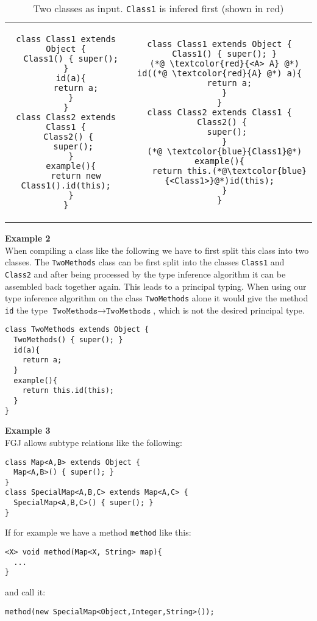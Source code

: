 \documentclass[runningheads]{llncs}
\begin{document}
\begin{table}
\caption{Two classes as input. \texttt{Class1} is infered first (shown in {\color{red}red})}
\begin{tabular}{cc}
\begin{lstlisting}
class Class1 extends Object {
  Class1() { super(); }
  id(a){
    return a;
  }
}
class Class2 extends Class1 {
  Class2() { 
    super(); 
  }
  example(){
    return new Class1().id(this);
  }
}
\end{lstlisting}
&
\begin{lstlisting}
class Class1 extends Object {
  Class1() { super(); }
  (*@ \textcolor{red}{<A> A} @*) id((*@ \textcolor{red}{A} @*) a){
    return a;
  }
}
class Class2 extends Class1 {
  Class2() { 
    super(); 
  }
  (*@ \textcolor{blue}{Class1}@*) example(){
    return this.(*@\textcolor{blue}{<Class1>}@*)id(this);
  }
}
\end{lstlisting}
\end{tabular}
\end{table}

\textbf{Example 2}\\
When compiling a class like the following
we have to first split this class into two classes.
The \texttt{TwoMethods} class can be first split into the classes \texttt{Class1}
and \texttt{Class2} and after being processed by the type inference algorithm it can be assembled back together again.
This leads to a principal typing.
When using our type inference algorithm on the class \texttt{TwoMethods} alone
it would give the method \texttt{id} the type $\texttt{TwoMethods} \to \texttt{TwoMethods}$,
which is not the desired principal type.
\begin{lstlisting}
class TwoMethods extends Object {
  TwoMethods() { super(); }
  id(a){
    return a;
  }
  example(){
    return this.id(this);
  }
}
\end{lstlisting}

\textbf{Example 3}\\
FGJ allows subtype relations like the following:
\begin{lstlisting}
class Map<A,B> extends Object {
  Map<A,B>() { super(); }
}
class SpecialMap<A,B,C> extends Map<A,C> {
  SpecialMap<A,B,C>() { super(); }
}
\end{lstlisting}

If for example we have a method \texttt{method} like this:
\begin{lstlisting}
<X> void method(Map<X, String> map){
  ...
}
\end{lstlisting}
and call it:
\begin{lstlisting}
method(new SpecialMap<Object,Integer,String>());
\end{lstlisting}
\end{document}
